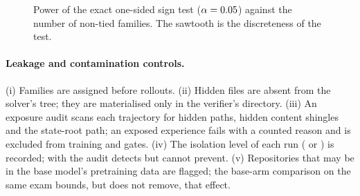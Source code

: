 \begin{table}[t]
\centering\small

\caption{Exact one-sided sign test at $\alpha=\alphalevel$: wins required and power if each
non-tied family is a win with the stated probability (design calculation).}\label{tab:design}
\end{table}

\begin{figure}[t]
\centering
{}
\caption{Power of the exact one-sided sign test ($\alpha=\alphalevel$) against the number of
non-tied families. The sawtooth is the discreteness of the test.}\label{fig:power}
\end{figure}

\paragraph{Leakage and contamination controls.} (i) Families are assigned before rollouts.
(ii) Hidden files are absent from the solver's tree; they are materialised only in the
verifier's directory. (iii) An exposure audit scans each trajectory for hidden paths, hidden
content shingles and the state-root path; an exposed experience fails with a counted reason
and is excluded from training and gates. (iv) The isolation level of each run
( or ) is recorded; with  the audit detects but cannot
prevent. (v) Repositories that may be in the base model's pretraining data are flagged;
the base-arm comparison on the same exam bounds, but does not remove, that effect.
